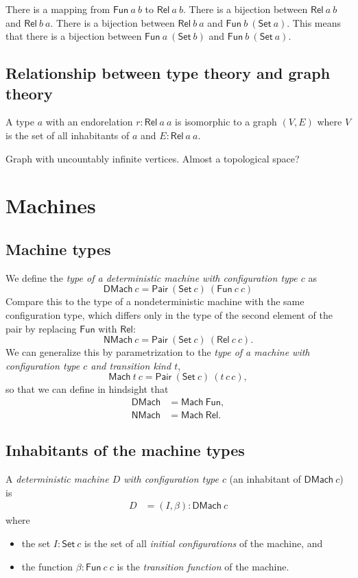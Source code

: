 \documentclass[10pt,statementpaper]{memoir}
\theoremstyle{definition}
\newcommand\Pair[2]{\mathsf{Pair}~#1~#2}
\newcommand\DMach[1]{\mathsf{DMach}~#1}
\newcommand\NMach[1]{\mathsf{NMach}~#1}
\newcommand\Mach[2]{\mathsf{Mach}~#1~#2}
\newcommand\Macha[1]{\mathsf{Mach}~#1}
\newcommand\sfDMach{\mathsf{DMach}}
\newcommand\sfNMach{\mathsf{NMach}}
\newcommand\sfFun{\mathsf{Fun}}
\newcommand\sfSet{\mathsf{Set}}
\newcommand\sfRel{\mathsf{Rel}}
\newcommand\Set[1]{\sfSet~#1}
\newcommand\Relab[2]{\sfRel~#1~#2}
\newcommand\Fun[2]{\sfFun~#1~#2}
\begin{document}
There is a mapping from $\Fun{a}{b}$ to $\Relab{a}{b}$.
There is a bijection between $\Relab{a}{b}$ and $\Relab{b}{a}$.
There is a bijection between $\Relab{b}{a}$ and $\Fun{b}{(\Set{a})}$.
This means that there is a bijection between $\Fun{a}{(\Set{b})}$ and $\Fun{b}{(\Set{a})}$.

\section{Relationship between type theory and graph theory}

A type $a$ with an endorelation $r : \Relab{a}{a}$
is isomorphic to a graph $(V, E)$
where $V$ is the set of all inhabitants of $a$
and $E : \Relab{a}{a}$.

Graph with uncountably infinite vertices.
Almost a topological space?

\chapter{Machines}

\section{Machine types}

We define the \emph{type of a deterministic machine with configuration type $c$} as
\[ \DMach{c} = \Pair{(\Set{c})}{(\Fun{c}{c})} \]
Compare this to the type of a nondeterministic machine
with the same configuration type,
which differs only in the type of the second element of the pair
by replacing $\sfFun$ with $\sfRel$:
\[ \NMach{c} = \Pair{(\Set{c})}{(\Relab{c}{c})}. \]
We can generalize this by parametrization to
the \emph{type of a machine with configuration type $c$
and transition kind $t$},
\[
    \Mach{t}{c} = \Pair{(\Set{c})}{(t\,c\,c)},
\]
so that we can define in hindsight that
\begin{align*}
       \sfDMach &= \Macha{\sfFun},
    \\
       \sfNMach &= \Macha{\sfRel}.
\end{align*}

\section{Inhabitants of the machine types}

A \emph{deterministic machine $D$ with configuration type $c$}
(an inhabitant of $\DMach{c}$) is
\begin{align*}
    D &= (I,\beta) : \DMach{c}
\end{align*}
where
\begin{itemize}
    \item the set $I : \Set{c}$ is the set of all \emph{initial configurations} of the machine, and
    \item the function $\beta : \Fun{c}{c}$ is the \emph{transition function} of the machine.
\end{itemize}
\end{document}
